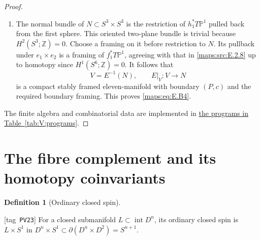\documentclass[11pt,a4paper]{article}
\numberwithin{equation}{section}
\theoremstyle{definition}
\newtheorem{definition}[definition]{Definition}
\newcommand{\StatementRecord}[4]{{\upshape\footnotesize[tag~\texttt{#3}]}\enspace\ignorespaces}
\begin{document}
\begin{proof}
\begin{enumerate}[label=\arabic*.,leftmargin=*]
\item The normal bundle of $N\subset S^3\times S^3$ is the
restriction of $h_1^*T\mathbb P^1$ pulled back from the first
sphere. This oriented two-plane bundle is trivial because
$H^2(S^3;\mathbb Z)=0$. Choose a framing on it before
restriction to $N$. Its pullback under $e_1\times e_2$
is a framing of $f_1^*T\mathbb P^1$, agreeing with that
in \ref{maps:src:E.2.8} up to homotopy since $H^1(S^6;\mathbb Z)=0$.
It follows that
\[
                  V=E^{-1}(N),\qquad E|_V:V\longrightarrow N
\]
is a compact stably framed eleven-manifold with boundary
$(P,c)$ and the required boundary framing. This proves \eqref{maps:eq:E.B4}.

\end{enumerate}
The finite algebra and combinatorial data are implemented in \hyperlink{prog:V:equivariant}{the programs in Table~\ref*{tab:V:programs}}.
\end{proof}


\section{The fibre complement and its homotopy coinvariants}\label{pub:V:sec-complement}

\begin{definition}[Ordinary closed spin]\hypertarget{tag-PV23}{}\label{def:V:ordinary-closed-spin}
\StatementRecord{def:V:ordinary-closed-spin}{proved}{PV23}{}
For a closed
submanifold $L\subset\operatorname{int}D^n$, its ordinary closed
spin is $L\times S^1$ in
$D^n\times S^1\subset\partial(D^n\times D^2)=S^{n+1}$.
\end{definition}
\end{document}
